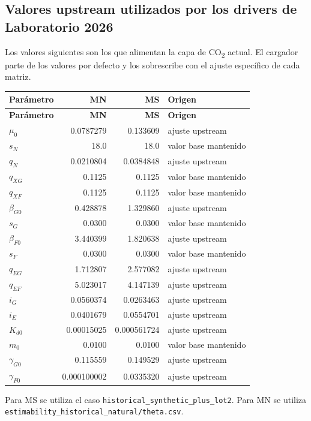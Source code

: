 \documentclass[11pt,a4paper]{article}
\begin{document}
\subsection{Valores upstream utilizados por los drivers de Laboratorio 2026}

Los valores siguientes son los que alimentan la capa de CO\textsubscript{2} actual. El cargador
parte de los valores por defecto y los sobrescribe con el ajuste específico de cada matriz.

\begin{longtable}{lrrl}
\toprule
\textbf{Parámetro} & \textbf{MN} & \textbf{MS} & \textbf{Origen}\\
\midrule
\endfirsthead
\toprule
\textbf{Parámetro} & \textbf{MN} & \textbf{MS} & \textbf{Origen}\\
\midrule
\endhead
$\mu_0$ & 0.0787279 & 0.133609 & ajuste upstream\\
$s_N$ & 18.0 & 18.0 & valor base mantenido\\
$q_N$ & 0.0210804 & 0.0384848 & ajuste upstream\\
$q_{XG}$ & 0.1125 & 0.1125 & valor base mantenido\\
$q_{XF}$ & 0.1125 & 0.1125 & valor base mantenido\\
$\beta_{G0}$ & 0.428878 & 1.329860 & ajuste upstream\\
$s_G$ & 0.0300 & 0.0300 & valor base mantenido\\
$\beta_{F0}$ & 3.440399 & 1.820638 & ajuste upstream\\
$s_F$ & 0.0300 & 0.0300 & valor base mantenido\\
$q_{EG}$ & 1.712807 & 2.577082 & ajuste upstream\\
$q_{EF}$ & 5.023017 & 4.147139 & ajuste upstream\\
$i_G$ & 0.0560374 & 0.0263463 & ajuste upstream\\
$i_E$ & 0.0401679 & 0.0554701 & ajuste upstream\\
$K_{d0}$ & 0.00015025 & 0.000561724 & ajuste upstream\\
$m_0$ & 0.0100 & 0.0100 & valor base mantenido\\
$\gamma_{G0}$ & 0.115559 & 0.149529 & ajuste upstream\\
$\gamma_{F0}$ & 0.000100002 & 0.0335320 & ajuste upstream\\
\bottomrule
\end{longtable}

Para MS se utiliza el caso \texttt{historical\_synthetic\_plus\_lot2}. Para MN se utiliza
\texttt{estimability\_historical\_natural/theta.csv}.
\end{document}
